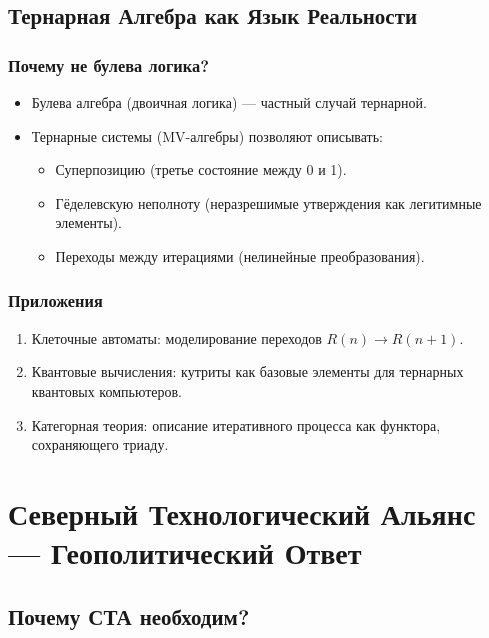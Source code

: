 \documentclass[11pt, a4paper]{article}
\begin{document}
\subsection{Тернарная Алгебра как Язык Реальности}
\subsubsection*{Почему не булева логика?}
\begin{itemize}
    \item Булева алгебра (двоичная логика) --- частный случай тернарной.
    \item Тернарные системы (MV-алгебры) позволяют описывать:
    \begin{itemize}
        \item Суперпозицию (третье состояние между 0 и 1).
        \item Гёделевскую неполноту (неразрешимые утверждения как легитимные элементы).
        \item Переходы между итерациями (нелинейные преобразования).
    \end{itemize}
\end{itemize}

\subsubsection*{Приложения}
\begin{enumerate}
    \item Клеточные автоматы: моделирование переходов $R(n) \rightarrow R(n+1)$.
    \item Квантовые вычисления: кутриты как базовые элементы для тернарных квантовых компьютеров.
    \item Категорная теория: описание итеративного процесса как функтора, сохраняющего триаду.
\end{enumerate}

\section{Северный Технологический Альянс --- Геополитический Ответ}

\subsection{Почему СТА необходим?}
\end{document}
